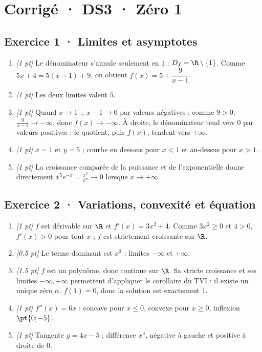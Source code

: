 \ifmxteacher\mxnewpage

\section*{Corrigé · DS3 · Zéro 1}\label{cor:4-1}

\subsection*{Exercice 1 · Limites et asymptotes}\begin{enumerate}

\item \textit{[1 pt]} Le dénominateur s'annule seulement en $1$ : $D_f=\R\setminus\{1\}$. Comme $5x+4=5(x-1)+9$, on obtient $f(x)=5+\dfrac{9}{x-1}$.

\item \textit{[1 pt]} Les deux limites valent $5$.

\item \textit{[1 pt]} Quand $x\to 1^-$, $x-1\to0$ par valeurs négatives ; comme $9>0$, $\frac{9}{x-1}\to-\infty$, donc $f(x)\to-\infty$. À droite, le dénominateur tend vers $0$ par valeurs positives : le quotient, puis $f(x)$, tendent vers $+\infty$.

\item \textit{[1 pt]} $x=1$ et $y=5$ ; courbe en dessous pour $x<1$ et au-dessus pour $x>1$.

\item \textit{[1 pt]} La croissance comparée de la puissance et de l'exponentielle donne directement $x^5e^{-x}=\frac{x^5}{e^x}\to0$ lorsque $x\to+\infty$.

\end{enumerate}

\subsection*{Exercice 2 · Variations, convexité et équation}\begin{enumerate}

\item \textit{[1 pt]} $f$ est dérivable sur $\R$ et $f'(x)=3x^2+4$. Comme $3x^2\ge0$ et $4>0$, $f'(x)>0$ pour tout $x$ ; $f$ est strictement croissante sur $\R$.

\item \textit{[\num{0,5} pt]} Le terme dominant est $x^3$ : limites $-\infty$ et $+\infty$.

\item \textit{[\num{1,5} pt]} $f$ est un polynôme, donc continue sur $\R$. Sa stricte croissance et ses limites $-\infty,+\infty$ permettent d'appliquer le corollaire du TVI : il existe un unique zéro $\alpha$. $f(1)=0$, donc la solution est exactement $1$.

\item \textit{[1 pt]} $f''(x)=6x$ : concave pour $x\le0$, convexe pour $x\ge0$, inflexion $\pt{0;-5}$.

\item \textit{[1 pt]} Tangente $y=4x-5$ ; différence $x^3$, négative à gauche et positive à droite de $0$.

\end{enumerate}

